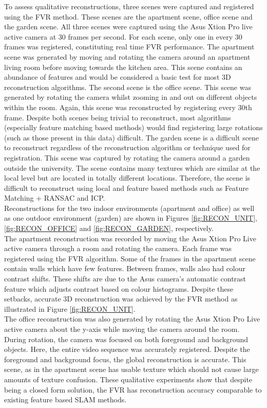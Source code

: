 To assess qualitative reconstructions, three scenes were captured and registered using the FVR method. These scenes are the apartment scene, office scene and the garden scene. All three scenes were captured using the Asus Xtion Pro live active camera at 30 frames per second. For each scene, only one in every 30 frames was registered, constituting real time FVR performance. The apartment scene was generated by moving and rotating the camera around an apartment living room before moving towards the kitchen area. This scene contains an abundance of features and would be considered a basic test for most 3D reconstruction algorithms. The second scene is the office scene. This scene was generated by rotating the camera whilst zooming in and out on different objects within the room. Again, this scene was reconstructed by registering every 30th frame. Despite both scenes being trivial to reconstruct, most algorithms (especially feature matching based methods) would find registering large rotations (such as those present in this data) difficult. The garden scene is a difficult scene to reconstruct regardless of the reconstruction algorithm or technique used for registration. This scene was captured by rotating the camera around a garden outside the university. The scene contains many textures which are similar at the local level but are located in totally different locations. Therefore, the scene is difficult to reconstruct using local and feature based methods such as Feature Matching + RANSAC and ICP. \\


Reconstructions for the two indoor environments (apartment and office) as well as one outdoor environment (garden) are shown in Figures \ref{fig:RECON_UNIT}, \ref{fig:RECON_OFFICE} and \ref{fig:RECON_GARDEN}, respectively. \\

The apartment reconstruction was recorded by moving the Asus Xtion Pro Live active camera through a room and rotating the camera. Each frame was registered using the FVR algorithm. Some of the frames in the apartment scene contain walls which have few features. Between frames, walls also had colour contrast shifts. These shifts are due to the Asus camera's automatic contrast feature which adjusts contrast based on colour histograms. Despite these setbacks, accurate 3D reconstruction was achieved by the FVR method as illustrated in Figure \ref{fig:RECON_UNIT}. \\


The office reconstruction was also generated by rotating the Asus Xtion Pro Live active camera about the y-axis while moving the camera around the room. During rotation, the camera was focused on both foreground and background objects. Here, the entire video sequence was accurately registered. Despite the foreground and background focus, the global reconstruction is accurate. This scene, as in the apartment scene has usable texture which should not cause large amounts of texture confusion. These qualitative experiments show that despite being a closed form solution, the FVR has reconstruction accuracy comparable to existing feature based SLAM methods. \\


